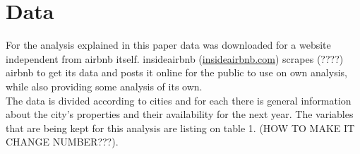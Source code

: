 \section{Data}\label{Sec:Data}

For the analysis explained in this paper data was downloaded for a website independent from airbnb itself. insideairbnb (\href{http://insideairbnb.com/}{insideairbnb.com}) scrapes (????) airbnb to get its data and posts it online for the public to use on own analysis, while also providing some analysis of its own.
\\
The data is divided according to cities and for each there is general information about the city's properties and their availability for the next year. The variables that are being kept for this analysis are listing on table 1. (HOW TO MAKE IT CHANGE NUMBER???).

\iffalse

